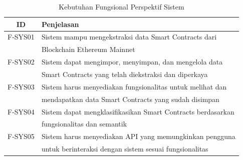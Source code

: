 \begin{table}[ht]
	\caption{Kebutuhan Fungsional Perspektif Sistem}
	\vspace{0.25cm}
	\begin{center}
		\begin{tabular}{|c|l|}
			\hline
			\textbf{ID} & \textbf{Penjelasan} \\ \hline
			F-SYS01 & Sistem mampu mengekstraksi data Smart Contracts dari \\ & Blockchain Ethereum Mainnet \\ \hline
			F-SYS02 & Sistem dapat mengimpor, menyimpan, dan mengelola data \\ & Smart Contracts yang telah diekstraksi dan diperkaya  \\ \hline
			F-SYS03 & Sistem harus menyediakan fungsionalitas untuk melihat dan \\ & mendapatkan data Smart Contracts yang sudah disimpan  \\ \hline
			F-SYS04 & Sistem dapat mengklasifikasikan Smart Contracts berdasarkan \\ & fungsionalitas dan semantik \\ \hline
			F-SYS05 & Sistem harus menyediakan API yang memungkinkan pengguna \\ & untuk berinteraksi dengan sistem sesuai fungsionalitas \\ \hline
		\end{tabular}
	\end{center}
\end{table}



